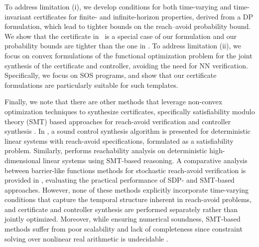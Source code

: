 \documentclass[journal,twoside,web]{ieeecolor}
\newcommand{\ml}[1]{{\color{blue}[ML: #1]}}
\newcommand{\rv}[1]{\textcolor{blue}{#1}}
\theoremstyle{definition}
\theoremstyle{plain}
\theoremstyle{plain}
\begin{document}
To address limitation (i), we develop conditions for both time-varying and time-invariant certificates for finite- and infinite-horizon properties, derived from a DP formulation, which lead to tighter bounds on the reach–avoid probability bound. We show that the certificate in~\cite{vzikelic2023learning} is a special case of our formulation 
and our probability bounds are tighter than the one in \cite{xue2025finite}.
To address limitation (ii), we focus on convex formulations of the functional optimization problem for the joint synthesis of the certificate and controller, avoiding the need for NN verification.  Specifically, we focus on SOS programs, and show that our certificate formulations are particularly suitable for such templates.




Finally, we note that there are other methods that leverage non-convex optimization techniques to synthesize certificates, specifically satisfiability modulo theory (SMT) based approaches for reach-avoid verification and controller synthesis \cite{fan2021controller,mufid2021smt,cao2025comparative}. In \cite{fan2021controller}, a sound control synthesis algorithm is presented for deterministic linear systems with reach-avoid specifications, formulated as a satisfiability problem. Similarly, \cite{mufid2021smt} performs reachability analysis on deterministic high-dimensional linear systems using SMT-based reasoning. A comparative analysis between barrier-like functions methods for stochastic reach-avoid verification is provided in \cite{cao2025comparative}, evaluating the practical performance of SDP- and SMT-based approaches. However, none of these methods explicitly incorporate time-varying conditions that capture the temporal structure inherent in reach-avoid problems, and certificate and controller synthesis are performed separately rather than jointly optimized.
Moreover, while ensuring numerical soundness, SMT-based methods suffer from poor scalability and lack of completeness since constraint solving over nonlinear real arithmetic is undecidable \cite{gao2013dreal}.  
\end{document}
